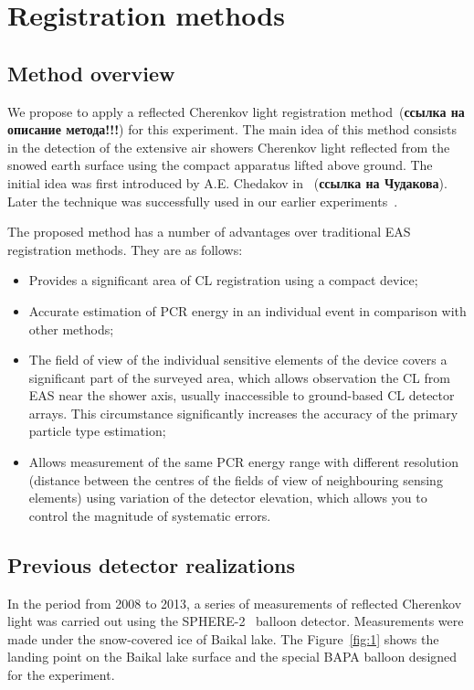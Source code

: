 \documentclass[a4paper,11pt]{article}
\begin{document}
\section{Registration methods}
\subsection{Method overview}
We propose to apply a reflected Cherenkov light registration method~\cite{}(\textbf{ссылка на описание метода!!!}) for this experiment. The main idea of this method consists in the detection of the extensive air showers Cherenkov light reflected from the snowed earth surface using the compact apparatus lifted above ground. The initial idea was first introduced by A.E. Chedakov in~\cite{} (\textbf{ссылка на Чудакова}). Later the technique was successfully used in our earlier experiments~\cite{1,2}.

The proposed method has a number of advantages over traditional EAS registration methods. They are as follows:
\begin{itemize}
\item Provides a significant area of CL registration using a compact device;
\item Accurate estimation of PCR energy in an individual event in comparison with other methods;
\item The field of view of the individual sensitive elements of the device covers a significant part of the surveyed area, which allows observation the CL from EAS near the shower axis, usually inaccessible to ground-based CL detector arrays. This circumstance significantly increases the accuracy of the primary particle type estimation;
\item Allows measurement of the same PCR energy range with different resolution (distance between the centres of the fields of view of neighbouring sensing elements) using variation of the detector elevation, which allows you to control the magnitude of systematic errors.
\end{itemize}

\subsection{Previous detector realizations}
In the period from 2008 to 2013, a series of measurements of reflected Cherenkov light was carried out using the SPHERE-2~\cite{1,2,3} balloon detector. Measurements were made under the snow-covered ice of Baikal lake. The Figure~\ref{fig:1} shows the landing point on the Baikal lake surface and the special BAPA balloon designed for the experiment. 
\end{document}
